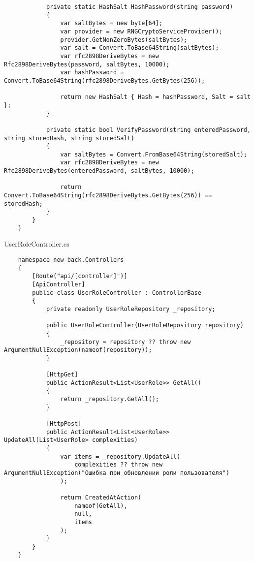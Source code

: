 \begin{lstlisting}
            private static HashSalt HashPassword(string password)
            {
                var saltBytes = new byte[64];
                var provider = new RNGCryptoServiceProvider();
                provider.GetNonZeroBytes(saltBytes);
                var salt = Convert.ToBase64String(saltBytes);
                var rfc2898DeriveBytes = new Rfc2898DeriveBytes(password, saltBytes, 10000);
                var hashPassword = Convert.ToBase64String(rfc2898DeriveBytes.GetBytes(256));
    
                return new HashSalt { Hash = hashPassword, Salt = salt };
            }
            
            private static bool VerifyPassword(string enteredPassword, string storedHash, string storedSalt)
            {
                var saltBytes = Convert.FromBase64String(storedSalt);
                var rfc2898DeriveBytes = new Rfc2898DeriveBytes(enteredPassword, saltBytes, 10000);
                
                return Convert.ToBase64String(rfc2898DeriveBytes.GetBytes(256)) == storedHash;
            }
        }
    }    
\end{lstlisting}

UserRoleController.cs
\lstset{style=sharpc}
\begin{lstlisting}
    namespace new_back.Controllers
    {
        [Route("api/[controller]")]
        [ApiController]
        public class UserRoleController : ControllerBase
        {
            private readonly UserRoleRepository _repository;
            
            public UserRoleController(UserRoleRepository repository)
            {
                _repository = repository ?? throw new ArgumentNullException(nameof(repository));
            }
            
            [HttpGet]
            public ActionResult<List<UserRole>> GetAll()
            {
                return _repository.GetAll();
            }
            
            [HttpPost]
            public ActionResult<List<UserRole>> UpdateAll(List<UserRole> complexities)
            {
                var items = _repository.UpdateAll(
                    complexities ?? throw new ArgumentNullException("Ошибка при обновлении роли пользователя")
                );
    
                return CreatedAtAction(
                    nameof(GetAll),
                    null,
                    items
                );
            }
        }
    }
\end{lstlisting}

